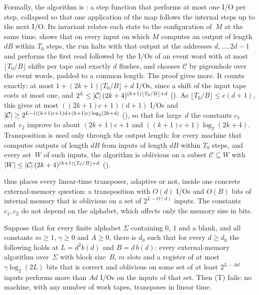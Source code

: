 \begin{outline}
Formally, the algorithm is : a step function that performs at most one I/O per step, collapsed
so that one application of the map follows the internal steps up to the next I/O. Its invariant relates each state to
the configuration of~$M$ at the same time.  shows that on every input on which $M$ computes
an output of length $dB$ within $T_0$ steps, the run halts with that output at the addresses $d,\dots,2d-1$ and performs
the first read followed by the I/Os of an event word with at most $\lfloor T_0/B\rfloor$ shifts per tape and exactly $d$
flushes, and  chooses $\mathcal C$ by pigeonhole over the event words, padded to a
common length.
The proof gives more. It counts exactly: at most $1+(2k+1)\lfloor T_0/B\rfloor+d$ I/Os, since a shift of the input tape
costs at most one, and $2^L\le\lvert \mathcal C \rvert\,(2k+4)^{(k+1)\lfloor T_0/B\rfloor+d}$
(). As $\lfloor T_0/B\rfloor\le c(d+1)$, this gives at most $((2k+1)c+1)(d+1)$ I/Os
and $\lvert \mathcal C \rvert\ge2^{L-(((k+1)c+1)d+(k+1)c)\log_2(2k+4)}$ (), so that for
large~$d$ the constants $c_1$ and~$c_2$ improve to about $(2k+1)c+1$ and $((k+1)c+1)\log_2(2k+4)$. Transposition is used
only through the output length: for every machine that computes outputs of length $dB$ from inputs of length $dB$ within
$T_0$ steps, and every set~$W$ of such inputs, the algorithm is oblivious on a subset $\mathcal C\subseteq W$ with
$\lvert W \rvert\le\lvert \mathcal C \rvert\,(2k+4)^{(k+1)\lfloor T_0/B\rfloor+d}$ ().
\end{outline}

 thus places every linear-time transposer, adaptive or not, inside one concrete external-memory question:
a transposition with $O(d)$ I/Os and $O(B)$ bits of internal memory that is oblivious on a set of $2^{L-O(d)}$ inputs.
The constants $c_1,c_2$ do not depend on the alphabet, which affects only the memory size in bits.

\begin{corollary}\label{cor:EM}
Suppose that for every finite alphabet $\Sigma$ containing $0$, $1$ and a blank, and all constants $m\ge1$, $\gamma\ge0$
and $A\ge0$, there is $d_0$ such that for every $d\ge d_0$ the following holds at $L=d^2b(d)$ and $B=d\,b(d)$: every
external-memory algorithm over~$\Sigma$ with block size~$B$, $m$ slots and a register of at most $\gamma\log_2(2L)$ bits
that is correct and oblivious on some set of at least $2^{L-Ad}$ inputs performs more than $Ad$ I/Os on the inputs of that
set. Then (T) fails: no machine, with any number of work tapes, transposes in linear time.
\end{corollary}

